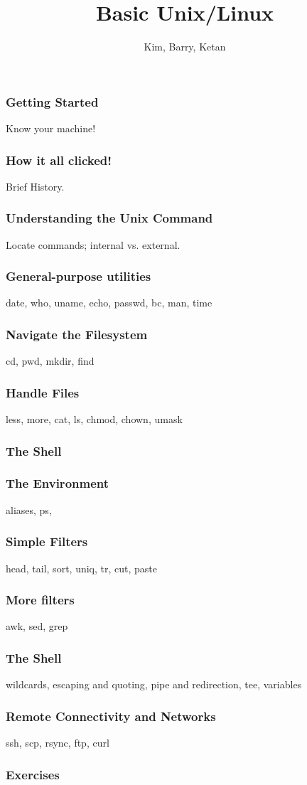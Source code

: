 \documentclass[hyperref={pdfpagelabels=false},12pt]{beamer}
\title[Basic Unix/Linux]{{Basic Unix/Linux}}
\author[Basic Unix/Linux]{{Kim, Barry, Ketan}}
\date{}
\begin{document}
\begin{frame}[plain]
\titlepage
\end{frame}

\begin{frame}
\frametitle{Getting Started}
Know your machine!
\end{frame}

\begin{frame}
\frametitle{How it all clicked!}
Brief History.
\end{frame}

\begin{frame}
\frametitle{Understanding the Unix Command}
Locate commands; internal vs. external.
\end{frame}

\begin{frame}
\frametitle{General-purpose utilities}
date, who, uname, echo, passwd, bc, man, time
\end{frame}

\begin{frame}
\frametitle{Navigate the Filesystem}
cd, pwd, mkdir, find
\end{frame}

\begin{frame}
\frametitle{Handle Files}
less, more, cat, ls, chmod, chown, umask
\end{frame}

\begin{frame}
\frametitle{The Shell}
\end{frame}

\begin{frame}
\frametitle{The Environment}
aliases, ps, 
\end{frame}

\begin{frame}
\frametitle{Simple Filters}
head, tail, sort, uniq, tr, cut, paste 
\end{frame}

\begin{frame}
\frametitle{More filters}
awk, sed, grep
\end{frame}

\begin{frame}
\frametitle{The Shell}
wildcards, escaping and quoting, pipe and redirection, tee, variables
\end{frame}

\begin{frame}
\frametitle{Remote Connectivity and Networks}
ssh, scp, rsync, ftp, curl
\end{frame}

\begin{frame}
\frametitle{Exercises}
\end{frame}
\end{document}
